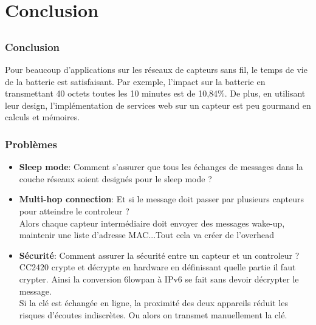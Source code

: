 \section{Conclusion}
\subsection{}
\begin{frame}
 \frametitle{Conclusion}
 Pour beaucoup d'applications sur les réseaux de capteurs sans fil, le temps de vie de la batterie est satisfaisant.
 Par exemple, l'impact sur la batterie en transmettant 40 octets toutes les 10 minutes est de 10,84\%.
 De plus, en utilisant leur design, l'implémentation de services web sur un capteur est peu gourmand en calculs et mémoires.
\end{frame}

\begin{frame}
 \frametitle{Problèmes}
 \begin{itemize}
  \item \textbf{Sleep mode}: Comment s'assurer que tous les échanges de messages dans la couche réseaux soient designés pour le sleep mode ?
  \item \textbf{Multi-hop connection}: Et si le message doit passer par plusieurs capteurs pour atteindre le controleur ?\\
  Alors chaque capteur intermédiaire doit envoyer des messages wake-up, maintenir une liste d'adresse MAC...Tout cela va créer de l'overhead
  \item \textbf{Sécurité}: Comment assurer la sécurité entre un capteur et un controleur ?\\
  CC2420 crypte et décrypte en hardware en définissant quelle partie il faut crypter.
  Ainsi la conversion 6lowpan à IPv6 se fait sans devoir décrypter le message.\\
  Si la clé est échangée en ligne, la proximité des deux appareils réduit les risques d'écoutes indiscrètes.
  Ou alors on transmet manuellement la clé.
 \end{itemize}
\end{frame}
